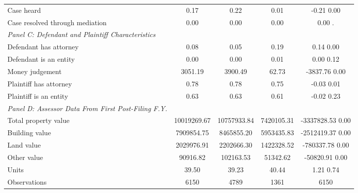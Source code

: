 \begin{table}[htbp]
\begin{tabular}{l*{4}{c}}
\hspace{0.25cm}Case heard&      0.17  &      0.22  &      0.01  &  -0.21 0.00\\
\hspace{0.25cm}Case resolved through mediation&      0.00  &      0.00  &      0.00  &      0.00 .\\
\emph{Panel C: Defendant and Plaintiff Characteristics}&            &            &            &            \\
\hspace{0.25cm}Defendant has attorney&      0.08  &      0.05  &      0.19  &   0.14 0.00\\
\hspace{0.25cm}Defendant is an entity&      0.00  &      0.00  &      0.01  &   0.00 0.12\\
\hspace{0.25cm}Money judgement&   3051.19  &   3900.49  &     62.73  & -3837.76 0.00\\
\hspace{0.25cm}Plaintiff has attorney&      0.78  &      0.78  &      0.75  &  -0.03 0.01\\
\hspace{0.25cm}Plaintiff is an entity&      0.63  &      0.63  &      0.61  &  -0.02 0.23\\
\emph{Panel D: Assessor Data From First Post-Filing F.Y.}&            &            &            &            \\
\hspace{0.25cm}Total property value&10019269.67  &10757933.84  &7420105.31  & -3337828.53 0.00\\
\hspace{0.25cm}Building value&7909854.75  &8465855.20  &5953435.83  & -2512419.37 0.00\\
\hspace{0.25cm}Land value&2029976.91  &2202666.30  &1422328.52  & -780337.78 0.00\\
\hspace{0.25cm}Other value&  90916.82  & 102163.53  &  51342.62  & -50820.91 0.00\\
\hspace{0.25cm}Units&     39.50  &     39.23  &     40.44  &   1.21 0.74\\
\midrule
Observations        &        6150&        4789&        1361&        6150\\
\bottomrule
\end{tabular}
\end{table}
